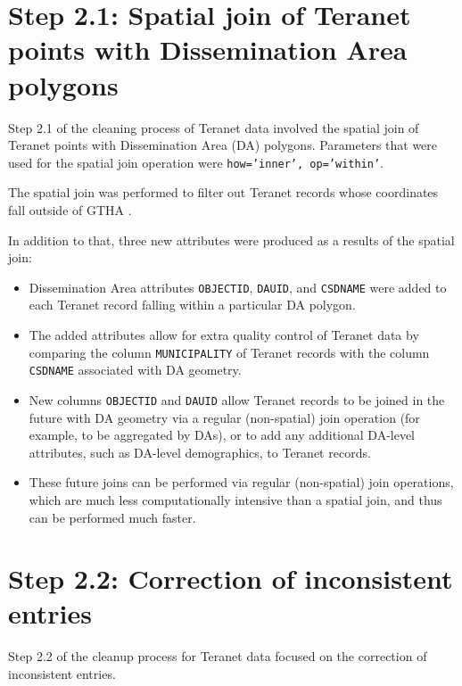 \documentclass[11pt]{article}
\begin{document}
    \section{Step 2.1: Spatial join of Teranet points with Dissemination Area polygons} \label{sec:teranet_da_spatial_join}

    Step 2.1 of the cleaning process of Teranet data involved the spatial join of Teranet points with Dissemination Area (DA) polygons.
    Parameters that were used for the spatial join operation were \texttt{how='inner', op='within'}.

    The spatial join was performed to filter out Teranet records whose coordinates fall outside of GTHA .

    In addition to that, three new attributes were produced as a results of the spatial join:
    \begin{itemize}
        \item Dissemination Area attributes \texttt{OBJECTID}, \texttt{DAUID}, and \texttt{CSDNAME} were added to each Teranet record falling within a particular DA polygon.
        \item The added attributes allow for extra quality control of Teranet data by comparing the column \texttt{MUNICIPALITY} of Teranet records with the column \texttt{CSDNAME} associated with DA geometry.
        \item New columns \texttt{OBJECTID} and \texttt{DAUID} allow Teranet records to be joined in the future with DA geometry via a regular (non-spatial) join operation (for example, to be aggregated by DAs), or to add any additional DA-level attributes, such as DA-level demographics, to Teranet records.
        \item These future joins can be performed via regular (non-spatial) join operations, which are much less computationally intensive than a spatial join, and thus can be performed much faster.
    \end{itemize}

    \section{Step 2.2: Correction of inconsistent entries} \label{sec:teranet_correction_inconsistent}

    Step 2.2 of the cleanup process for Teranet data focused on the correction of inconsistent entries.

    \vspace{5mm}
\end{document}
